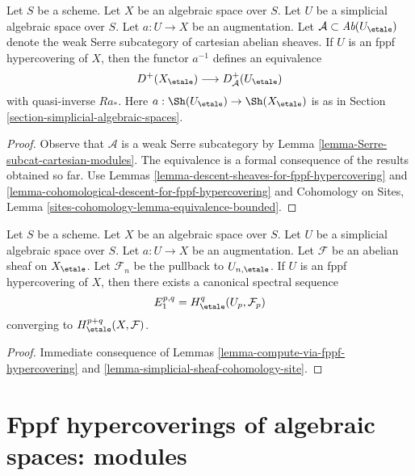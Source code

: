 \begin{lemma}
\label{lemma-fppf-hypercovering-equivalence-bounded}
Let $S$ be a scheme. Let $X$ be an algebraic space over $S$.
Let $U$ be a simplicial algebraic space over $S$. Let $a : U \to X$
be an augmentation.
Let $\mathcal{A} \subset \textit{Ab}(U_\etale)$
denote the weak Serre subcategory of cartesian abelian sheaves.
If $U$ is an fppf hypercovering of $X$, then
the functor $a^{-1}$ defines an equivalence
$$
D^+(X_\etale) \longrightarrow D_\mathcal{A}^+(U_\etale)
$$
with quasi-inverse $Ra_*$. Here $a : \Sh(U_\etale) \to \Sh(X_\etale)$
is as in Section \ref{section-simplicial-algebraic-spaces}.
\end{lemma}

\begin{proof}
Observe that $\mathcal{A}$ is a weak Serre subcategory by
Lemma \ref{lemma-Serre-subcat-cartesian-modules}.
The equivalence is a
formal consequence of the results obtained so far. Use
Lemmas \ref{lemma-descent-sheaves-for-fppf-hypercovering} and
\ref{lemma-cohomological-descent-for-fppf-hypercovering} and
Cohomology on Sites, Lemma \ref{sites-cohomology-lemma-equivalence-bounded}.
\end{proof}

\begin{lemma}
\label{lemma-spectral-sequence-fppf-hypercovering}
Let $S$ be a scheme. Let $X$ be an algebraic space over $S$.
Let $U$ be a simplicial algebraic space over $S$. Let $a : U \to X$
be an augmentation. Let $\mathcal{F}$ be an abelian sheaf
on $X_\etale$. Let $\mathcal{F}_n$ be the pullback to $U_{n, \etale}$.
If $U$ is an fppf hypercovering of $X$, then
there exists a canonical spectral sequence
$$
E_1^{p, q} = H^q_\etale(U_p, \mathcal{F}_p)
$$
converging to $H^{p + q}_\etale(X, \mathcal{F})$.
\end{lemma}

\begin{proof}
Immediate consequence of Lemmas \ref{lemma-compute-via-fppf-hypercovering}
and \ref{lemma-simplicial-sheaf-cohomology-site}.
\end{proof}








\section{Fppf hypercoverings of algebraic spaces: modules}
\label{section-fppf-hypercovering-modules}

